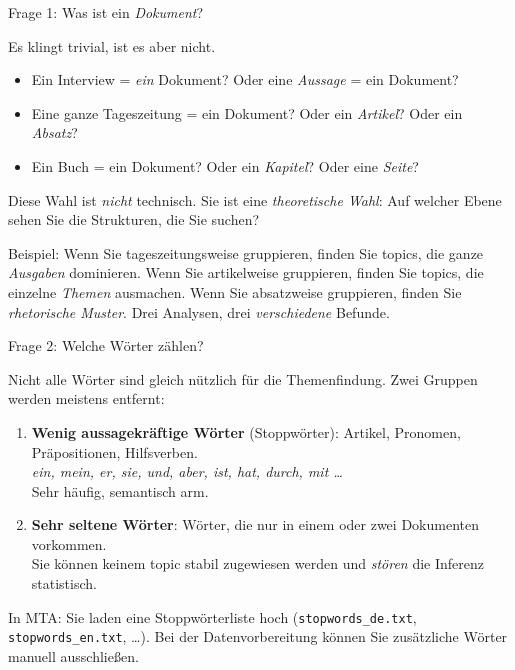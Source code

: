 \documentclass[aspectratio=169,11pt]{beamer}
\let\oldemph\emph
\renewcommand{\emph}[1]{{\color{solCyan}\oldemph{#1}}}
\let\oldtextbf\textbf
\renewcommand{\textbf}[1]{{\color{solBase3}\oldtextbf{#1}}}
\begin{document}
\begin{frame}{Frage 1: Was ist ein \emph{Dokument}?}

  Es klingt trivial, ist es aber nicht.

  \vfill
  \begin{itemize}
    \item Ein Interview = \emph{ein} Dokument? Oder eine
          \emph{Aussage} = ein Dokument?
    \vfill
    \item Eine ganze Tageszeitung = ein Dokument? Oder ein
          \emph{Artikel}? Oder ein \emph{Absatz}?
    \vfill
    \item Ein Buch = ein Dokument? Oder ein \emph{Kapitel}?
          Oder eine \emph{Seite}?
  \end{itemize}

  \vfill
  Diese Wahl ist \emph{nicht} technisch. Sie ist eine \emph{theoretische
  Wahl}: Auf welcher Ebene sehen Sie die Strukturen, die Sie suchen?

  \vfill
  Beispiel: Wenn Sie tageszeitungsweise gruppieren, finden Sie topics,
  die ganze \emph{Ausgaben} dominieren. Wenn Sie artikelweise gruppieren,
  finden Sie topics, die einzelne \emph{Themen} ausmachen. Wenn Sie
  absatzweise gruppieren, finden Sie \emph{rhetorische Muster}. Drei
  Analysen, drei \emph{verschiedene} Befunde.

\end{frame}

\begin{frame}{Frage 2: Welche Wörter zählen?}

  Nicht alle Wörter sind gleich nützlich für die Themenfindung.
  Zwei Gruppen werden meistens entfernt:

  \vfill
  \begin{enumerate}
    \item \textbf{Wenig aussagekräftige Wörter} (Stoppwörter):
          Artikel, Pronomen, Präpositionen, Hilfsverben.
          \\[2pt]
          \emph{ein, mein, er, sie, und, aber, ist, hat, durch, mit \dots}
          \\[2pt]
          Sehr häufig, semantisch arm.
    \vfill
    \item \textbf{Sehr seltene Wörter}: Wörter, die nur in einem oder
          zwei Dokumenten vorkommen.
          \\[2pt]
          Sie können keinem topic stabil zugewiesen werden und
          \emph{stören} die Inferenz statistisch.
  \end{enumerate}

  \vfill
  \footnotesize\color{black!60}
  In MTA: Sie laden eine Stoppwörterliste hoch
  (\texttt{stopwords\_de.txt}, \texttt{stopwords\_en.txt}, \dots).
  Bei der Datenvorbereitung können Sie zusätzliche Wörter manuell
  ausschließen.

\end{frame}
\end{document}
